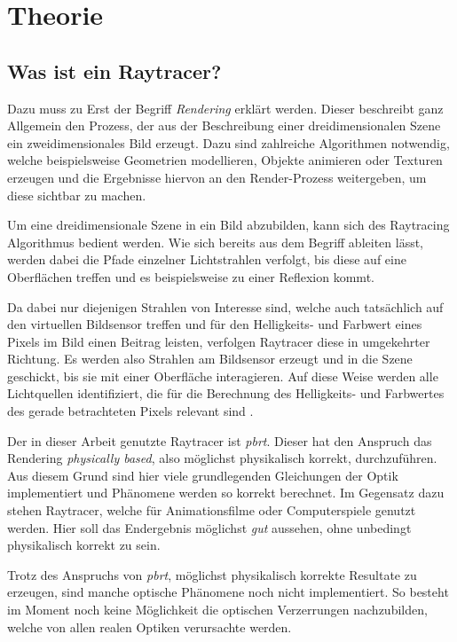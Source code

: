 \section{Theorie}

\subsection{Was ist ein Raytracer?}\label{sec:Raytracer}

Dazu muss zu Erst der Begriff \textit{Rendering} erklärt werden. Dieser beschreibt ganz Allgemein den Prozess, der aus der Beschreibung einer dreidimensionalen Szene ein zweidimensionales Bild erzeugt. Dazu sind zahlreiche Algorithmen notwendig, welche beispielsweise Geometrien modellieren, Objekte animieren oder Texturen erzeugen und die Ergebnisse hiervon an den Render-Prozess weitergeben, um diese sichtbar zu machen. 

Um eine dreidimensionale Szene in ein Bild abzubilden, kann sich des Raytracing Algorithmus bedient werden. Wie sich bereits aus dem Begriff ableiten lässt, werden dabei die Pfade einzelner \glqq Lichtstrahlen\grqq{ } verfolgt, bis diese auf eine Oberflächen treffen und es beispielsweise zu einer Reflexion kommt. 

Da dabei nur diejenigen Strahlen von Interesse sind, welche auch tatsächlich auf den virtuellen Bildsensor treffen und für den Helligkeits- und Farbwert eines Pixels im Bild einen Beitrag leisten, verfolgen Raytracer diese in umgekehrter Richtung. Es werden also Strahlen am Bildsensor erzeugt und in die Szene geschickt, bis sie mit einer Oberfläche interagieren. Auf diese Weise werden alle Lichtquellen identifiziert, die für die Berechnung des Helligkeits- und Farbwertes des gerade betrachteten Pixels relevant sind \cite{pbrt_book}. 

Der in dieser Arbeit genutzte Raytracer ist \textit{pbrt}\cite{pbrt}. Dieser hat den Anspruch das Rendering \textit{physically based}, also möglichst physikalisch korrekt, durchzuführen. Aus diesem Grund sind hier viele grundlegenden Gleichungen der Optik implementiert und Phänomene werden so korrekt berechnet. Im Gegensatz dazu stehen Raytracer, welche für Animationsfilme oder Computerspiele genutzt werden. Hier soll das Endergebnis möglichst \textit{gut} aussehen, ohne unbedingt physikalisch korrekt zu sein. 

Trotz des Anspruchs von \textit{pbrt}, möglichst physikalisch korrekte Resultate zu erzeugen, sind manche optische Phänomene noch nicht implementiert. So besteht im Moment noch keine Möglichkeit die optischen Verzerrungen nachzubilden, welche von allen realen Optiken verursachte werden.


